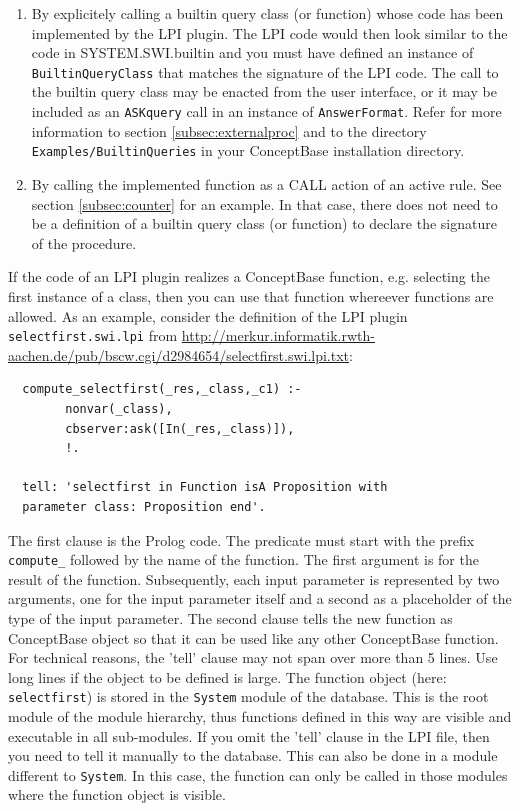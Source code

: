 \begin{enumerate}
\item By explicitely calling a builtin query class (or function) whose code has been implemented by the LPI plugin.
The LPI code would then look similar to the code in SYSTEM.SWI.builtin and you must have
defined an instance of {\tt BuiltinQueryClass} that matches the signature of the
LPI code. The call to the builtin query class may be enacted from the user interface, or
it may be included as an {\tt ASKquery} call in an instance of {\tt AnswerFormat}. 
Refer for more information to section \ref{subsec:externalproc} and to the directory
{\tt Examples/BuiltinQueries} in your ConceptBase installation directory.
\item By calling the implemented function as a CALL action of an active rule. See section \ref{subsec:counter}
for an example. In that case, there does not need to be a definition of a builtin query
class (or function) to declare the signature of the procedure.
\end{enumerate}

If the code of an LPI plugin realizes a ConceptBase function, e.g. selecting the first instance of a class,
then you can use that function whereever functions are allowed. As an example,
consider the definition of the LPI plugin {\tt selectfirst.swi.lpi} from 
\url{http://merkur.informatik.rwth-aachen.de/pub/bscw.cgi/d2984654/selectfirst.swi.lpi.txt}:

\begin{verbatim}
  compute_selectfirst(_res,_class,_c1) :-
        nonvar(_class),                              
        cbserver:ask([In(_res,_class)]),             
        !.

  tell: 'selectfirst in Function isA Proposition with
  parameter class: Proposition end'.
\end{verbatim}


The first clause is the Prolog code. The predicate must start with the prefix {\tt compute\_} followed by the
name of the function.
The first argument is for the result of the function. Subsequently, each input parameter is
represented by two arguments, one for the input parameter itself and a second as a placeholder
of the type of the input parameter. 
The second clause tells the new function as ConceptBase object so that it can be used like any other ConceptBase
function. For technical reasons, the 'tell' clause may not span over more than 5 lines. Use
long lines if the object to be defined is large. The function object (here: {\tt selectfirst}) is stored
in the {\tt System} module of the database. This is the root module of the module hierarchy, thus
functions defined in this way are visible and executable in all sub-modules.
If you omit the 'tell' clause in the LPI file, then you need to tell it manually to the
database. This can also be done in a module different to {\tt System}. In this case, the
function can only be called in those modules where the function object is visible.

